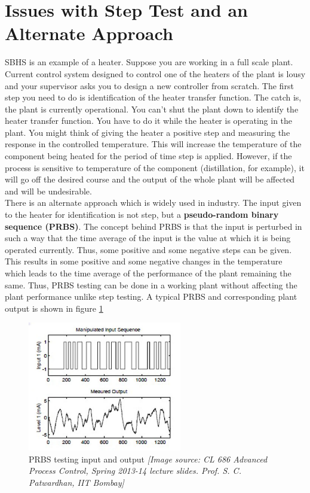 \section{Issues with Step Test and an Alternate Approach}

SBHS is an example of a heater. Suppose you are working in a full scale plant. Current control system designed to control
one of the heaters of the plant is lousy and your supervisor asks you to design a new controller from scratch. The first step
you need to do is identification of the heater transfer function. The catch is, the plant is currently
operational. You can't shut the plant down to identify the heater transfer function. You have to do it while the heater is
operating in the plant. You might think of giving the heater a positive step and measuring the response in the controlled 
temperature. This will increase the temperature of the component being heated for the period of time step is applied. However,
if the process is sensitive to temperature of the component (distillation, for example), it will go off the desired course and
the output of the whole plant will be affected and will be undesirable.\\

There is an alternate approach which is widely used in industry. The input given to the heater for identification is not 
step, but a \textbf{pseudo-random binary sequence (PRBS)}. The concept behind PRBS is that the input is perturbed in such
a way that the time average of the input is the value at which it is being operated currently. Thus, some positive and some
negative steps can be given. This results in some positive and some negative changes in the temperature which leads to the time
average of the performance of the plant remaining the same. Thus, PRBS testing can be done in a working plant without 
affecting the plant performance unlike step testing. A typical PRBS and corresponding plant output is shown in 
figure \ref{sample-prbs}

\begin{figure}[H]
\begin{centering}
\includegraphics[width=0.6\textwidth]{prbs/PRBS}
\par\end{centering}

\caption{PRBS testing input and output \textit{{[}Image source: CL 686 Advanced
Process Control, Spring 2013-14 lecture slides. Prof. S. C. Patwardhan, IIT Bombay{]}}}
\label{sample-prbs}
\end{figure}


